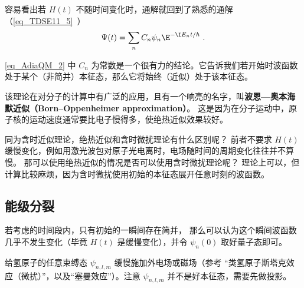 容易看出若 $H(t)$ 不随时间变化时，通解就回到了熟悉的通解（\autoref{eq_TDSE11_5}~）
\begin{equation}
\Psi(t) = \sum_n C_n \psi_n \E^{-\I E_n t/\hbar}~.
\end{equation}

\autoref{eq_AdiaQM_2} 中 $C_n$ 为常数是一个很有力的结论。它告诉我们若开始时波函数处于某个（非简并）本征态，那么它将始终（近似）处于该本征态。

该理论在对分子的计算中有广泛的应用，且有一个响亮的名字，叫\textbf{波恩—奥本海默近似（Born–Oppenheimer approximation）}。 这是因为在分子运动中，原子核的运动速度通常要比电子慢得多，使绝热近似效果较好。

同为含时近似理论，绝热近似和含时微扰理论有什么区别呢？ 前者不要求 $H(t)$ 缓慢变化，例如用激光波包对原子光电离时，电场随时间的周期变化往往并不算慢。 那可以使用绝热近似的情况是否可以使用含时微扰理论呢？ 理论上可以，但计算比较麻烦，因为含时微扰使用初始的本征态展开任意时刻的波函数。

\subsection{能级分裂}
若考虑的时间段内，只有初始的一瞬间存在简并， 那么可以认为这个瞬间波函数几乎不发生变化（毕竟 $H(t)$ 是缓慢变化），并令 $\psi_n(0)$ 取好量子态即可。
\begin{example}{}
给氢原子的任意束缚态 $\psi_{n,l,m}$ 缓慢施加外电场或磁场（参考 “类氢原子斯塔克效应（微扰）”，以及“塞曼效应”）。注意 $\psi_{n,l,m}$ 并不是好本征态，需要先做投影。
\end{example}

